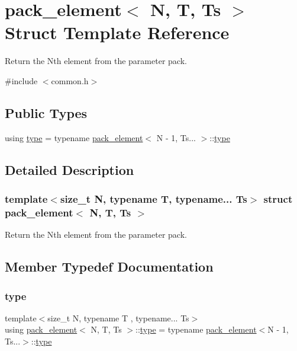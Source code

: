 \hypertarget{structpack__element}{}\section{pack\+\_\+element$<$ N, T, Ts $>$ Struct Template Reference}
\label{structpack__element}


Return the Nth element from the parameter pack.  




{\ttfamily \#include $<$common.\+h$>$}

\subsection*{Public Types}
\begin{DoxyCompactItemize}
\item 
using \mbox{\hyperlink{structpack__element_a977333130c98c1ac63a8c0a72de74cfa}{type}} = typename \mbox{\hyperlink{structpack__element}{pack\+\_\+element}}$<$ N -\/ 1, Ts... $>$\+::\mbox{\hyperlink{structpack__element_a977333130c98c1ac63a8c0a72de74cfa}{type}}
\end{DoxyCompactItemize}


\subsection{Detailed Description}
\subsubsection*{template$<$size\+\_\+t N, typename T, typename... Ts$>$\newline
struct pack\+\_\+element$<$ N, T, Ts $>$}

Return the Nth element from the parameter pack. 

\subsection{Member Typedef Documentation}
\mbox{\label{structpack__element_a977333130c98c1ac63a8c0a72de74cfa}} 
\subsubsection{\texorpdfstring{type}{type}}
{\footnotesize\ttfamily template$<$size\+\_\+t N, typename T , typename... Ts$>$ \\
using \mbox{\hyperlink{structpack__element}{pack\+\_\+element}}$<$ N, T, Ts $>$\+::\mbox{\hyperlink{structpack__element_a977333130c98c1ac63a8c0a72de74cfa}{type}} =  typename \mbox{\hyperlink{structpack__element}{pack\+\_\+element}}$<$N -\/ 1, Ts...$>$\+::\mbox{\hyperlink{structpack__element_a977333130c98c1ac63a8c0a72de74cfa}{type}}}



